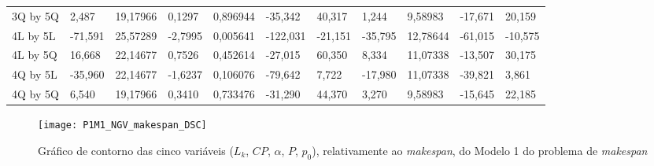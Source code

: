 \begin{table}[H]
{\begin{tabular}{lllllllllll}
\rowcolor[HTML]{FFFFFF} 
3Q by 5Q                              & 2,487                           & 19,17966                        & 0,1297                          & 0,896944                        & -35,342                               & 40,317                                & 1,244                           & 9,58983                              & -17,671                               & 20,159                                \\
\rowcolor[HTML]{FFFFFF} 
4L by 5L                              & {\color[HTML]{FF0000} -71,591}  & {\color[HTML]{FF0000} 25,57289} & {\color[HTML]{FF0000} -2,7995}  & {\color[HTML]{FF0000} 0,005641} & {\color[HTML]{FF0000} -122,031}       & {\color[HTML]{FF0000} -21,151}        & {\color[HTML]{FF0000} -35,795}  & {\color[HTML]{FF0000} 12,78644}      & {\color[HTML]{FF0000} -61,015}        & {\color[HTML]{FF0000} -10,575}        \\
\rowcolor[HTML]{FFFFFF} 
4L by 5Q                              & 16,668                          & 22,14677                        & 0,7526                          & 0,452614                        & -27,015                               & 60,350                                & 8,334                           & 11,07338                             & -13,507                               & 30,175                                \\
\rowcolor[HTML]{FFFFFF} 
4Q by 5L                              & -35,960                         & 22,14677                        & -1,6237                         & 0,106076                        & -79,642                               & 7,722                                 & -17,980                         & 11,07338                             & -39,821                               & 3,861                                 \\
\rowcolor[HTML]{FFFFFF} 
4Q by 5Q                              & 6,540                           & 19,17966                        & 0,3410                          & 0,733476                        & -31,290                               & 44,370                                & 3,270                           & 9,58983                              & -15,645                               & 22,185                               
\end{tabular}
}
\end{table}

\begin{figure}[H]
\caption{Gráfico de contorno das cinco variáveis ($L_{k}$, $CP$, $\alpha$, $P$, $p_{0}$), relativamente ao \textit{makespan}, do Modelo 1 do problema de \textit{makespan}}
\centering
\texttt{[image: P1M1\_NGV\_makespan\_DSC]}
\end{figure}

